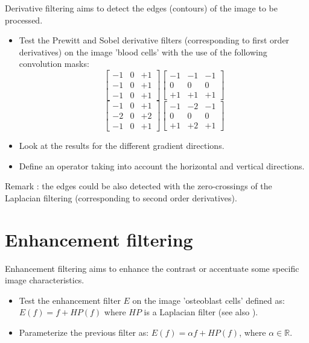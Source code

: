 Derivative filtering aims to detect the edges (contours) of the image to be processed.
\begin{qbox}
\begin{itemize}
	\item
Test the Prewitt and Sobel derivative filters (corresponding to first order derivatives) on the image 'blood cells' with the use of the following convolution masks:
$$
\left[
\begin{array}{ccc}
-1&0&+1\\
-1&0&+1\\
-1&0&+1
\end{array}
\right]
\left[
\begin{array}{rrr}
-1&-1&-1\\
0&0&0\\
+1&+1&+1
\end{array}
\right]
$$
$$
\left[
\begin{array}{ccc}
-1&0&+1\\
-2&0&+2\\
-1&0&+1
\end{array}
\right]
\left[
\begin{array}{rrr}
-1&-2&-1\\
0&0&0\\
+1&+2&+1
\end{array}
\right]
$$
\item Look at the results for the different gradient directions.
\item Define an operator taking into account the horizontal and vertical directions.
\end{itemize}
\end{qbox}

Remark : the edges could be also detected with the zero-crossings of the Laplacian filtering  (corresponding to second order derivatives).

 

\section{Enhancement filtering}
Enhancement filtering aims to enhance the contrast or accentuate some specific image characteristics.
\begin{qbox}
\begin{itemize}
	\item Test the enhancement filter $E$ on the image 'osteoblast cells' defined as:
	$E(f)=f+HP(f)$ where $HP$ is a Laplacian filter (see also  ).
	\item Parameterize the previous filter as:
	$E(f)=\alpha f+HP(f)$, where $\alpha\in\mathbb{R}$.
\end{itemize}
\end{qbox}


